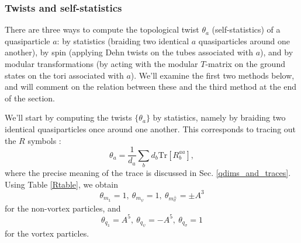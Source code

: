 \documentclass[12pt,a4paper]{article}
\newcommand{\unit}{\mathds{1}}
\newcommand\be            {\begin{equation}}
\newcommand\ee            {\end{equation}}
\newcommand{\dave}[1]{{\color{ao(english)}\footnotesize{(DA) #1}}}
\newcommand{\ethan}[1]{{\color{amethyst}\footnotesize{(EL) #1}}}
\begin{document}

\subsubsection{Twists and self-statistics}

There are three ways to compute the topological twist $\theta_a$ (self-statistics) of a quasiparticle $a$: by statistics (braiding two identical $a$ quasiparticles around one another), by spin (applying Dehn twists on the tubes associated with $a$), and by modular transformations (by acting with the modular $T$-matrix on the ground states on the tori associated with $a$). 
We'll examine the first two methods below, and will comment on the relation between these and the third method at the end of the section. 

We'll start by computing the twists $\{\theta_a\}$ by statistics, namely by braiding two identical quasiparticles once around one another. 
This corresponds to tracing out the $R$ symbols \cite{barkeshli2014}:
\be \label{Tmattr} \theta_a = \frac{1}{d_a}\sum_b d_b \text{Tr}[R^{aa}_b],\ee
where the precise meaning of the trace is discussed in Sec. \ref{qdims_and_traces}.
Using Table \ref{Rtable}, we obtain
\be \theta_{m_\unit} = 1,\ \theta_{m_\psi} = 1,\ \theta_{m^\pm_\sigma} = \pm A^3\ee
for the non-vortex particles, and 
\be \theta_{q_\unit} = A^5,\ \theta_{q_\psi} = -A^5,\ \theta_{q_\sigma} = 1\ee
for the vortex particles. 
\end{document}

